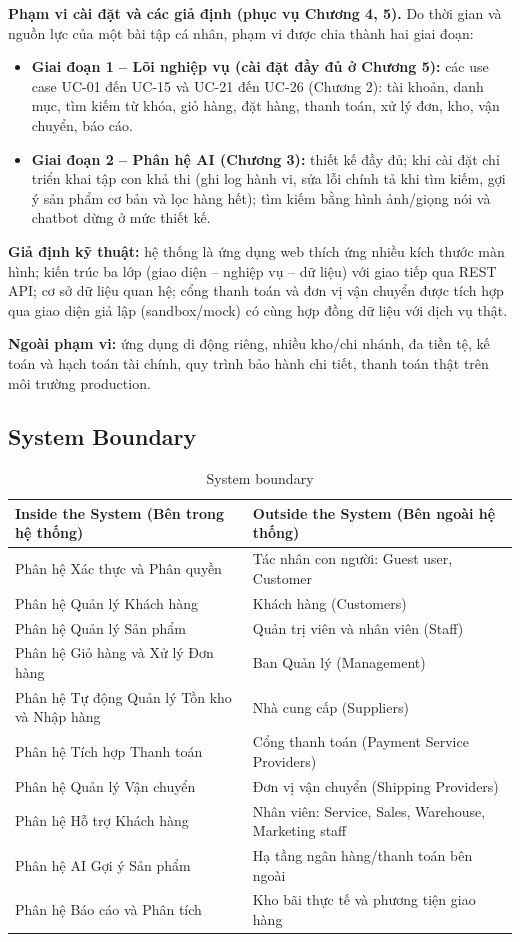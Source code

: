 \documentclass[12pt,a4paper,oneside]{report}
\begin{document}
\textbf{Phạm vi cài đặt và các giả định (phục vụ Chương 4, 5).} Do thời gian và nguồn lực của một bài tập cá nhân, phạm vi được chia thành hai giai đoạn:

\begin{itemize}
  \item \textbf{Giai đoạn 1 -- Lõi nghiệp vụ (cài đặt đầy đủ ở Chương 5):} các use case UC-01 đến UC-15 và UC-21 đến UC-26 (Chương 2): tài khoản, danh mục, tìm kiếm từ khóa, giỏ hàng, đặt hàng, thanh toán, xử lý đơn, kho, vận chuyển, báo cáo.
  \item \textbf{Giai đoạn 2 -- Phân hệ AI (Chương 3):} thiết kế đầy đủ; khi cài đặt chỉ triển khai tập con khả thi (ghi log hành vi, sửa lỗi chính tả khi tìm kiếm, gợi ý sản phẩm cơ bản và lọc hàng hết); tìm kiếm bằng hình ảnh/giọng nói và chatbot dừng ở mức thiết kế.
\end{itemize}

\textbf{Giả định kỹ thuật:} hệ thống là ứng dụng web thích ứng nhiều kích thước màn hình; kiến trúc ba lớp (giao diện -- nghiệp vụ -- dữ liệu) với giao tiếp qua REST API; cơ sở dữ liệu quan hệ; cổng thanh toán và đơn vị vận chuyển được tích hợp qua giao diện giả lập (sandbox/mock) có cùng hợp đồng dữ liệu với dịch vụ thật.

\textbf{Ngoài phạm vi:} ứng dụng di động riêng, nhiều kho/chi nhánh, đa tiền tệ, kế toán và hạch toán tài chính, quy trình bảo hành chi tiết, thanh toán thật trên môi trường production.

\subsection{System Boundary}

\begin{longtable}{p{7.9cm}p{7.9cm}}
\caption{System boundary}\\
\toprule
\textbf{Inside the System (Bên trong hệ thống)} & \textbf{Outside the System (Bên ngoài hệ thống)} \\
\midrule
\endhead
\bottomrule
\endlastfoot
Phân hệ Xác thực và Phân quyền & Tác nhân con người: Guest user, Customer \\
Phân hệ Quản lý Khách hàng & Khách hàng (Customers) \\
Phân hệ Quản lý Sản phẩm & Quản trị viên và nhân viên (Staff) \\
Phân hệ Giỏ hàng và Xử lý Đơn hàng & Ban Quản lý (Management) \\
Phân hệ Tự động Quản lý Tồn kho và Nhập hàng & Nhà cung cấp (Suppliers) \\
Phân hệ Tích hợp Thanh toán & Cổng thanh toán (Payment Service Providers) \\
Phân hệ Quản lý Vận chuyển & Đơn vị vận chuyển (Shipping Providers) \\
Phân hệ Hỗ trợ Khách hàng & Nhân viên: Service, Sales, Warehouse, Marketing staff \\
Phân hệ AI Gợi ý Sản phẩm & Hạ tầng ngân hàng/thanh toán bên ngoài \\
Phân hệ Báo cáo và Phân tích & Kho bãi thực tế và phương tiện giao hàng \\
\end{longtable}
\end{document}
